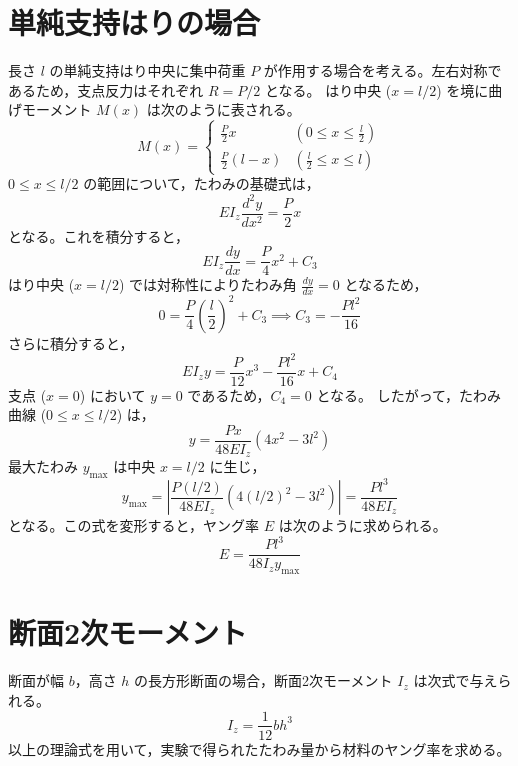 \documentclass[10pt,a4paper,titlepage]{jreport}
\begin{document}
\section{単純支持はりの場合}
長さ $l$ の単純支持はり中央に集中荷重 $P$ が作用する場合を考える。左右対称であるため，支点反力はそれぞれ $R = P/2$ となる。
はり中央 ($x=l/2$) を境に曲げモーメント $M(x)$ は次のように表される。
\begin{equation}
    M(x) = \begin{cases} \frac{P}{2}x & (0 \le x \le \frac{l}{2}) \\ \frac{P}{2}(l-x) & (\frac{l}{2} \le x \le l) \end{cases}
\end{equation}
$0 \le x \le l/2$ の範囲について，たわみの基礎式は，
\begin{equation}
    EI_z \frac{d^2y}{dx^2} = \frac{P}{2}x
\end{equation}
となる。これを積分すると，
\begin{equation}
    EI_z \frac{dy}{dx} = \frac{P}{4}x^2 + C_3
\end{equation}
はり中央 ($x=l/2$) では対称性によりたわみ角 $\frac{dy}{dx}=0$ となるため，
\begin{equation}
    0 = \frac{P}{4}\left(\frac{l}{2}\right)^2 + C_3 \implies C_3 = -\frac{Pl^2}{16}
\end{equation}
さらに積分すると，
\begin{equation}
    EI_z y = \frac{P}{12}x^3 - \frac{Pl^2}{16}x + C_4
\end{equation}
支点 ($x=0$) において $y=0$ であるため，$C_4 = 0$ となる。
したがって，たわみ曲線 ($0 \le x \le l/2$) は，
\begin{equation}
    y = \frac{Px}{48EI_z}(4x^2 - 3l^2)
\end{equation}
最大たわみ $y_{\max}$ は中央 $x=l/2$ に生じ，
\begin{equation}
    y_{\max} = \left| \frac{P(l/2)}{48EI_z}(4(l/2)^2 - 3l^2) \right| = \frac{Pl^3}{48EI_z}
\end{equation}
となる。この式を変形すると，ヤング率 $E$ は次のように求められる。
\begin{equation}
    E = \frac{Pl^3}{48I_z y_{\max}}
\end{equation}

\section{断面2次モーメント}
断面が幅 $b$，高さ $h$ の長方形断面の場合，断面2次モーメント $I_z$ は次式で与えられる。
\begin{equation}
    I_z = \frac{1}{12} bh^3
\end{equation}
以上の理論式を用いて，実験で得られたたわみ量から材料のヤング率を求める。
\end{document}
